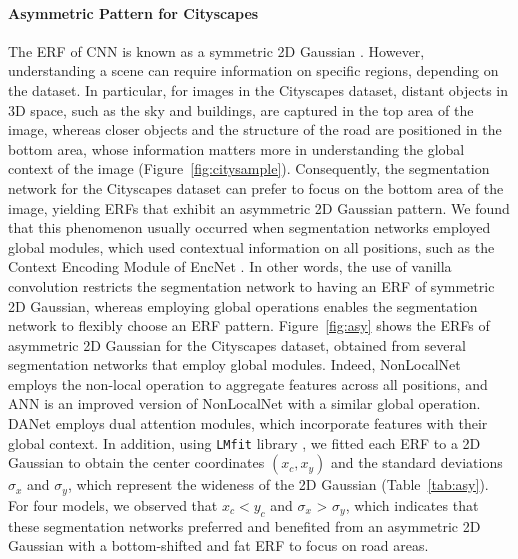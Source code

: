 \documentclass{article}
\def\figref#1{Figure~\ref{#1}}
\def\tabref#1{Table~\ref{#1}}
\begin{document}
\paragraph{Asymmetric Pattern for Cityscapes} The ERF of CNN is known as a symmetric 2D Gaussian \citep{DBLP:conf/nips/LuoLUZ16,DBLP:journals/prl/KimCJLJK23}. However, understanding a scene can require information on specific regions, depending on the dataset. In particular, for images in the Cityscapes dataset, distant objects in 3D space, such as the sky and buildings, are captured in the top area of the image, whereas closer objects and the structure of the road are positioned in the bottom area, whose information matters more in understanding the global context of the image (\figref{fig:citysample}). Consequently, the segmentation network for the Cityscapes dataset can prefer to focus on the bottom area of the image, yielding ERFs that exhibit an asymmetric 2D Gaussian pattern. We found that this phenomenon usually occurred when segmentation networks employed global modules, which used contextual information on all positions, such as the Context Encoding Module of EncNet \citep{DBLP:conf/cvpr/0005DSZWTA18}. In other words, the use of vanilla convolution restricts the segmentation network to having an ERF of symmetric 2D Gaussian, whereas employing global operations enables the segmentation network to flexibly choose an ERF pattern. \figref{fig:asy} shows the ERFs of asymmetric 2D Gaussian for the Cityscapes dataset, obtained from several segmentation networks that employ global modules. Indeed, NonLocalNet \citep{DBLP:conf/cvpr/0004GGH18} employs the non-local operation to aggregate features across all positions, and ANN \citep{DBLP:conf/iccv/ZhuXBHB19} is an improved version of NonLocalNet with a similar global operation. DANet \citep{DBLP:conf/cvpr/FuLT0BFL19} employs dual attention modules, which incorporate features with their global context. In addition, using \texttt{LMfit} library \citep{newville2016lmfit}, we fitted each ERF to a 2D Gaussian to obtain the center coordinates $(x_c, x_y)$ and the standard deviations $\sigma_x$ and $\sigma_y$, which represent the wideness of the 2D Gaussian (\tabref{tab:asy}). For four models, we observed that $x_c < y_c$ and $\sigma_x$ > $\sigma_y$, which indicates that these segmentation networks preferred and benefited from an asymmetric 2D Gaussian with a bottom-shifted and fat ERF to focus on road areas.
\end{document}
